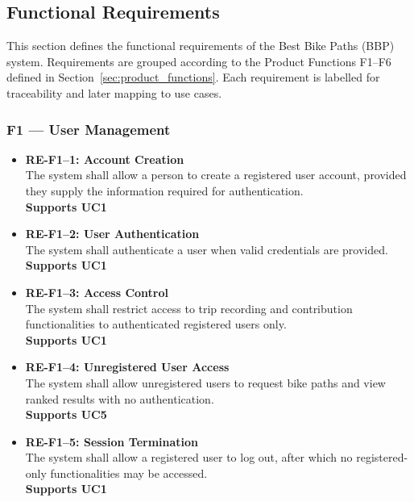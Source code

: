 \subsection{Functional Requirements}\label{sec:functional_requirements}

This section defines the functional requirements of the Best Bike Paths (BBP) system.
Requirements are grouped according to the Product Functions F1--F6 defined in Section~\ref{sec:product_functions}.
Each requirement is labelled for traceability and later mapping to use cases.


\subsubsection*{F1 --- User Management}\label{sec:F1}

\begin{itemize}

    \item \textbf{RE-F1--1: Account Creation}\label{req:RE-F1-1}\\
    The system shall allow a person to create a registered user account, 
    provided they supply the information required for authentication.\\
    \textbf{Supports UC1}

    \item \textbf{RE-F1--2: User Authentication}\label{req:RE-F1-2}\\
    The system shall authenticate a user when valid credentials are provided.\\
    \textbf{Supports UC1}

    \item \textbf{RE-F1--3: Access Control}\label{req:RE-F1-3}\\
    The system shall restrict access to trip recording and contribution 
    functionalities to authenticated registered users only.\\
    \textbf{Supports UC1}

    \item \textbf{RE-F1--4: Unregistered User Access}\label{req:RE-F1-4}\\
    The system shall allow unregistered users to request bike paths and 
    view ranked results with no authentication.\\
    \textbf{Supports UC5}

    \item \textbf{RE-F1--5: Session Termination}\label{req:RE-F1-5}\\
    The system shall allow a registered user to log out, after which no 
    registered-only functionalities may be accessed.\\
    \textbf{Supports UC1}

\end{itemize}

